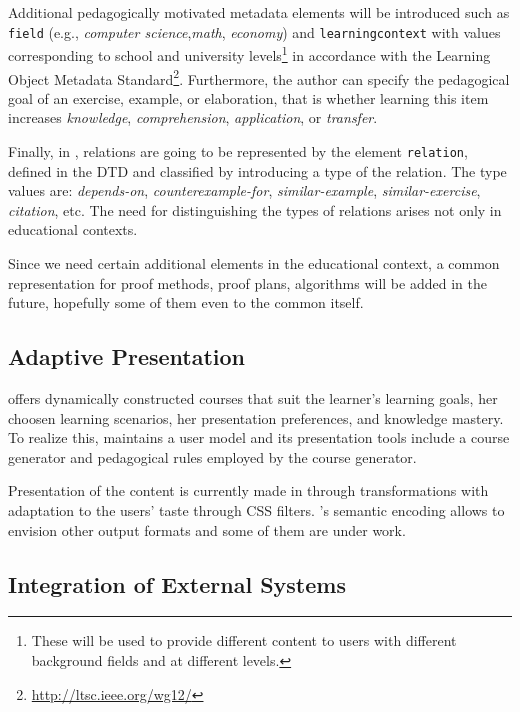 Additional pedagogically motivated metadata elements will be introduced such as
{\tt field} (e.g., {\it computer science},{\it math}, {\it economy}) and
{\tt{learning\-context}} with values corresponding to school and university
levels\footnote{These will be used to provide different content to users with
  different background fields and at different levels.} in accordance with the
Learning Object Metadata Standard\footnote{\url{http://ltsc.ieee.org/wg12/}}.
Furthermore, the author can specify the pedagogical goal of an exercise, example,
or elaboration, that is whether learning this item increases {\it knowledge}, {\it
  comprehension}, {\it application}, or {\it transfer}.

Finally, in {\activemath}, relations are going to be represented by the element
{\tt relation}, defined in the {\activemath} DTD and classified by introducing a
type of the relation. The type values are: {\it depends-on}, {\it
  counterexam\-ple-for}, {\it similar-example}, {\it similar-exercise}, {\it
  citation}, etc. The need for distinguishing the types of relations arises not
only in educational contexts.

Since we need certain additional {\omdoc} elements in the educational context, a
common representation for proof methods, proof plans, algorithms will be added in
the future, hopefully some of them even to the common {\omdoc} itself.



\subsection{Adaptive Presentation}

{\activemath} offers dynamically constructed courses that suit the learner's
learning goals, her choosen learning scenarios, her presentation preferences, and
knowledge mastery. To realize this, {\activemath} maintains a user model and its
presentation tools include a course generator and pedagogical rules employed by
the course generator.

Presentation of the content is currently made in {\html} through {\xslt}
transformations with adaptation to the users' taste through CSS filters.
{\omdoc}'s semantic encoding allows to envision other output formats and some of
them are under work.

\subsection{Integration of External Systems}

